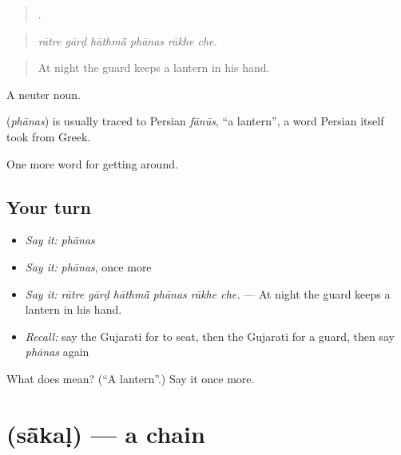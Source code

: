 \begin{quote}
     .
\end{quote}

\begin{quote}
\emph{rātre gārḍ hāthmā̃ phānas rākhe che.}
\end{quote}

\begin{quote}
At night the guard keeps a lantern in his hand.
\end{quote}

A neuter noun.

\begin{cousinweb}
\textbf{} (\emph{phānas}) is usually traced to Persian \emph{fānūs}, \textquotedblleft{}a lantern\textquotedblright{}, a word Persian itself took from Greek.
\end{cousinweb}

\begin{grammarlens}[title={What you've built}]
One more word for getting around.
\end{grammarlens}

\subsection*{Your turn}
\begin{itemize}
\raggedright
  \item \emph{Say it:} \emph{phānas}
  \item \emph{Say it:} \emph{phānas}, once more
  \item \emph{Say it:} \emph{rātre gārḍ hāthmā̃ phānas rākhe che.} — At night the guard keeps a lantern in his hand.
  \item \emph{Recall:} say the Gujarati for to seat, then the Gujarati for a guard, then say \emph{phānas} again
\end{itemize}

\begin{tcolorbox}[breakable,colback=teal!4,colframe=teal!35!black,title={Before you move on}]
What does  mean? (\textquotedblleft{}A lantern\textquotedblright{}.) Say it once more.
\end{tcolorbox}
\section[\texorpdfstring{\gu{સાંકળ} (sā̃kaḷ)}{સાંકળ (sā̃kaḷ)}]{ (sā̃kaḷ) — a chain}

\label{lesson:GU-C396-sakal}



